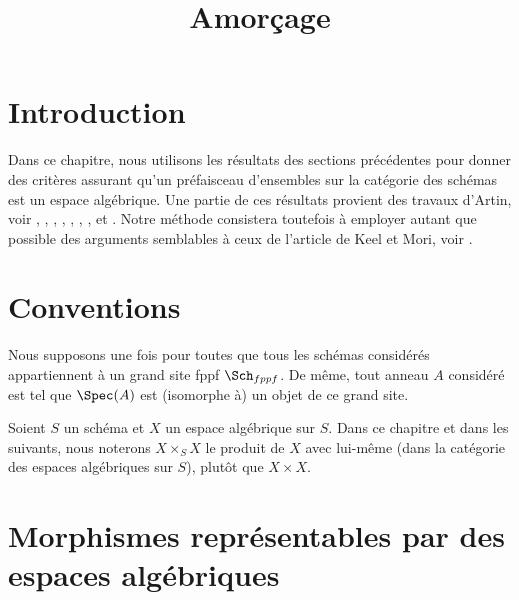

%


\title{Amorçage}

\maketitle

\label{section-phantom}

\tableofcontents




\section{Introduction}
\label{section-introduction}

\noindent
Dans ce chapitre, nous utilisons les résultats des sections précédentes pour
donner des critères assurant qu'un préfaisceau d'ensembles sur la catégorie des
schémas est un espace algébrique. Une partie de ces résultats provient des
travaux d'Artin, voir \cite{ArtinI}, \cite{ArtinII},
\cite{Artin-Theorem-Representability},
\cite{Artin-Construction-Techniques},
\cite{Artin-Algebraic-Spaces},
\cite{Artin-Algebraic-Approximation},
\cite{Artin-Implicit-Function},
et \cite{ArtinVersal}.
Notre méthode consistera toutefois à employer autant que possible des arguments
semblables à ceux de l'article de Keel et Mori, voir
\cite{K-M}.

\section{Conventions}
\label{section-conventions}

\noindent
Nous supposons une fois pour toutes que tous les schémas considérés appartiennent
à un grand site fppf $\Sch_{fppf}$. De même, tout anneau $A$ considéré
est tel que $\Spec(A)$ est (isomorphe à) un
objet de ce grand site.

\medskip\noindent
Soient $S$ un schéma et $X$ un espace algébrique sur $S$.
Dans ce chapitre et dans les suivants, nous noterons $X \times_S X$
le produit de $X$ avec lui-même (dans la catégorie des espaces
algébriques sur $S$), plutôt que $X \times X$.




\section{Morphismes représentables par des espaces algébriques}
\label{section-morphism-representable-by-spaces}

